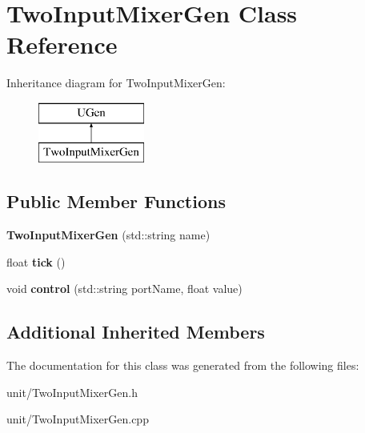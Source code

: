 \hypertarget{classTwoInputMixerGen}{}\section{Two\+Input\+Mixer\+Gen Class Reference}
\label{classTwoInputMixerGen}
Inheritance diagram for Two\+Input\+Mixer\+Gen\+:\begin{figure}[H]
\begin{center}
\leavevmode
\includegraphics[height=2.000000cm]{classTwoInputMixerGen}
\end{center}
\end{figure}
\subsection*{Public Member Functions}
\begin{DoxyCompactItemize}
\item 
{\bfseries Two\+Input\+Mixer\+Gen} (std\+::string name)\hypertarget{classTwoInputMixerGen_ae150f51a934ffb7330f8a2852b094539}{}\label{classTwoInputMixerGen_ae150f51a934ffb7330f8a2852b094539}

\item 
float {\bfseries tick} ()\hypertarget{classTwoInputMixerGen_aef96ef6828e767384a8881d108c0d52b}{}\label{classTwoInputMixerGen_aef96ef6828e767384a8881d108c0d52b}

\item 
void {\bfseries control} (std\+::string port\+Name, float value)\hypertarget{classTwoInputMixerGen_ab8d7d00eb0c692a8c2de706f58673d3d}{}\label{classTwoInputMixerGen_ab8d7d00eb0c692a8c2de706f58673d3d}

\end{DoxyCompactItemize}
\subsection*{Additional Inherited Members}


The documentation for this class was generated from the following files\+:\begin{DoxyCompactItemize}
\item 
unit/Two\+Input\+Mixer\+Gen.\+h\item 
unit/Two\+Input\+Mixer\+Gen.\+cpp\end{DoxyCompactItemize}
